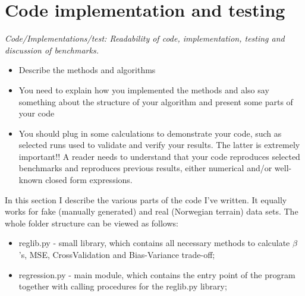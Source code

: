 \section{Code implementation and testing}
\label{code_imp}

\textit{Code/Implementations/test: Readability of code, implementation, testing and discussion of benchmarks.}
\begin{itemize}
    \item Describe the methods and algorithms
    \item You need to explain how you implemented the methods and also say something about the structure of your algorithm and present some parts of your code
    \item You should plug in some calculations to demonstrate your code, such as selected runs used to validate and verify your results. The latter is extremely important!! A reader needs to understand that your code reproduces selected benchmarks and reproduces previous results, either numerical and/or well-known closed form expressions.
\end{itemize}

In this section I describe the various parts of the code I've written. It equally works for fake (manually generated) and real (Norwegian terrain) data sets. The whole folder structure can be viewed as follows:
\begin{itemize}
    \item reglib.py - small library, which contains all necessary methods to calculate $\beta$'s, MSE, CrossValidation and Bias-Variance trade-off;
    \item regression.py - main module, which contains the entry point of the program together with calling procedures for the reglib.py library;
\end{itemize}

